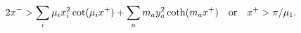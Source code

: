 \begin{equation}
\label{ineq2}
2x^- > \sum_i \mu_i x_i^2 \cot(\mu_i  x^+) + 
\sum_a m_a y_a^2 \coth(m_a  x^+)
\quad {\rm or} \quad x^+ > \pi/\mu_1.  
\end{equation}

